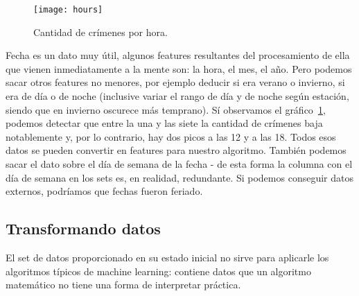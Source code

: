 \begin{figure}[H]
\texttt{[image: hours]}
\caption{Cantidad de crímenes por hora.}
\label{fig:hours}
\end{figure}

Fecha es un dato muy útil, algunos features resultantes del procesamiento de ella que vienen inmediatamente a la mente son: la hora, el mes, el año. Pero podemos sacar otros features no menores, por ejemplo deducir si era verano o invierno, si era de día o de noche (inclusive variar el rango de día y de noche según estación, siendo que en invierno oscurece más temprano). Sí observamos el gráfico~\ref{fig:hours}, podemos detectar que entre la una y las siete la cantidad de crímenes baja notablemente y, por lo contrario, hay dos picos a las 12 y a las 18. Todos esos datos se pueden convertir en features para nuestro algoritmo. También podemos sacar el dato sobre el día de semana de la fecha - de esta forma la columna con el día de semana en los sets es, en realidad, redundante. Si podemos conseguir datos externos, podríamos que fechas fueron feriado.






\subsection{Transformando datos} %
\label{sub:transformando_datos}

El set de datos proporcionado en su estado inicial no sirve para aplicarle los algoritmos típicos de machine learning: contiene datos que un algoritmo matemático no tiene una forma de interpretar práctica.

